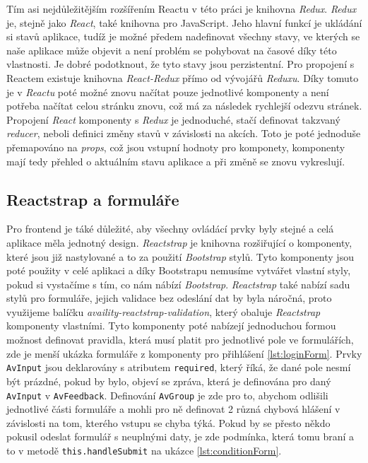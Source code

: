 Tím asi nejdůležitějším rozšířením Reactu v této práci je knihovna \textit{Redux}. \textit{Redux} je, stejně jako \textit{React}, také knihovna pro JavaScript. Jeho hlavní funkcí je
ukládání si stavů aplikace, tudíž je možné předem nadefinovat všechny stavy, ve kterých se naše aplikace může objevit a není problém se pohybovat na časové
díky této vlastnosti. Je dobré podotknout, že tyto stavy jsou perzistentní. Pro propojení s Reactem existuje knihovna \textit{React-Redux} přímo od vývojářů \textit{Reduxu}. \cite{redux}
Díky tomuto je v \textit{Reactu} poté možné znovu načítat pouze jednotlivé komponenty a není potřeba načítat celou stránku znovu, což má za následek rychlejší odezvu stránek.
Propojení \textit{React} komponenty s \textit{Redux} je jednoduché, stačí definovat takzvaný \textit{reducer}, neboli definici změny stavů v závislosti na akcích. Toto je
poté jednoduše přemapováno na \textit{props}, což jsou vstupní hodnoty pro komponety, komponenty mají tedy přehled o aktuálním stavu aplikace a při změně se znovu vykreslují.

\subsection{Reactstrap a formuláře}

Pro frontend je táké důležité, aby všechny ovládácí prvky byly stejné a celá aplikace měla jednotný design. \textit{Reactstrap} je knihovna rozšiřující  o komponenty,
které jsou již nastylované a to za použití \textit{Bootstrap} stylů. Tyto komponenty jsou poté použity v celé aplikaci a díky Bootstrapu nemusíme vytvářet vlastní styly,
pokud si vystačíme s tím, co nám nábízí \textit{Bootstrap}. \textit{Reactstrap} také nabízí sadu stylů pro formuláře, jejich validace bez odeslání dat by byla náročná, proto
využijeme balíčku \textit{availity-reactstrap-validation}, který obaluje \textit{Reactstrap} komponenty vlastními. Tyto komponenty poté nabízejí jednoduchou formou možnost
definovat pravidla, která musí platit pro jednotlivé pole ve formulářích, zde je menší ukázka formuláře z komponenty pro přihlášení \ref{lst:loginForm}. Prvky \texttt{AvInput}
jsou deklarovány s atributem \texttt{required}, který říká, že dané pole nesmí být prázdné, pokud by bylo, objeví se zpráva, která je definována pro daný \texttt{AvInput} v
\texttt{AvFeedback}. Definování \texttt{AvGroup} je zde pro to, abychom odlišili jednotlivé části formuláře a mohli pro ně definovat 2 různá chybová hlášení v závislosti na
tom, kterého vstupu se chyba týká. Pokud by se přesto někdo pokusil odeslat formulář s neuplnými daty, je zde podmínka, která tomu braní a to v metodě \texttt{this.handleSubmit}
na ukázce \ref{lst:conditionForm}.


